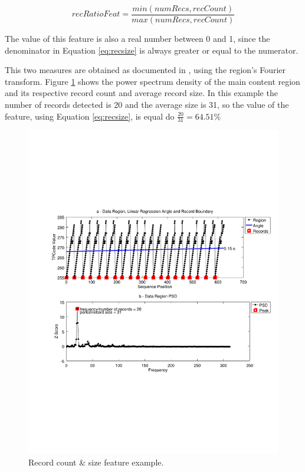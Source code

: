 \begin{equation}\label{eq:recsize}
recRatioFeat = \frac{min(numRecs, recCount)}{max(numRecs, recCount)}
\end{equation}

The value of this feature is also a real number between 0 and 1, since the
denominator in Equation \ref{eq:recsize} is always greater or equal to the
numerator.

This two measures are obtained as documented in
\cite{Velloso:2017:ERW:3132847.3132875}, using the region's Fourier transform.
Figure \ref{fig:fft} shows the power spectrum density of the main content region
and its respective record count and average record size. In this example the
number of records detected is 20 and the average size is 31, so the value of the
feature, using Equation \ref{eq:recsize}, is equal do $\frac{20}{31}=64.51\%$

\begin{figure}[h]
  \centering
     \includegraphics[trim={2.0cm 7.4cm 0.7cm 7.4cm}, clip,  width=\columnwidth]{img/fftreg.pdf}
  \caption{Record count \& size feature example.}
  \label{fig:fft}
\end{figure}

